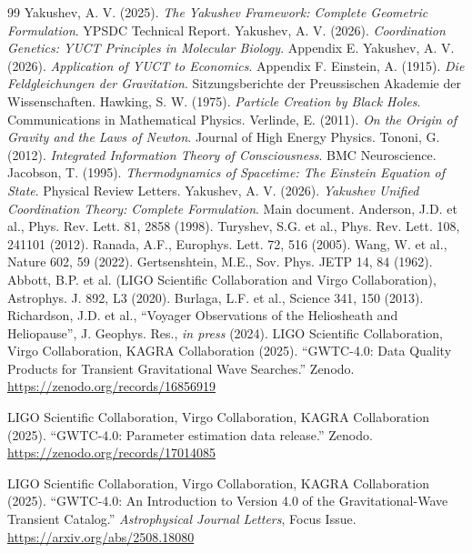 \documentclass[12pt,a4paper]{article}
\theoremstyle{remark}
\begin{document}
	\begin{thebibliography}{99}
		 Yakushev, A. V. (2025). \emph{The Yakushev Framework: Complete Geometric Formulation}. YPSDC Technical Report.
		 Yakushev, A. V. (2026). \emph{Coordination Genetics: YUCT Principles in Molecular Biology}. Appendix E.
		 Yakushev, A. V. (2026). \emph{Application of YUCT to Economics}. Appendix F.
		 Einstein, A. (1915). \emph{Die Feldgleichungen der Gravitation}. Sitzungsberichte der Preussischen Akademie der Wissenschaften.
		 Hawking, S. W. (1975). \emph{Particle Creation by Black Holes}. Communications in Mathematical Physics.
		 Verlinde, E. (2011). \emph{On the Origin of Gravity and the Laws of Newton}. Journal of High Energy Physics.
		 Tononi, G. (2012). \emph{Integrated Information Theory of Consciousness}. BMC Neuroscience.
		 Jacobson, T. (1995). \emph{Thermodynamics of Spacetime: The Einstein Equation of State}. Physical Review Letters.
		 Yakushev, A. V. (2026). \emph{Yakushev Unified Coordination Theory: Complete Formulation}. Main document.
		Anderson, J.D. et al., Phys. Rev. Lett. 81, 2858 (1998).
		Turyshev, S.G. et al., Phys. Rev. Lett. 108, 241101 (2012).
		Ranada, A.F., Europhys. Lett. 72, 516 (2005).
		Wang, W. et al., Nature 602, 59 (2022).
		Gertsenshtein, M.E., Sov. Phys. JETP 14, 84 (1962).
		Abbott, B.P. et al. (LIGO Scientific Collaboration and Virgo Collaboration), Astrophys. J. 892, L3 (2020).
		Burlaga, L.F. et al., Science 341, 150 (2013).
		Richardson, J.D. et al., ``Voyager Observations of the Heliosheath and Heliopause'', J. Geophys. Res., \textit{in press} (2024).
		LIGO Scientific Collaboration, Virgo Collaboration, KAGRA Collaboration (2025). ``GWTC-4.0: Data Quality Products for Transient Gravitational Wave Searches.'' Zenodo. \url{https://zenodo.org/records/16856919}
		
		LIGO Scientific Collaboration, Virgo Collaboration, KAGRA Collaboration (2025). ``GWTC-4.0: Parameter estimation data release.'' Zenodo. \url{https://zenodo.org/records/17014085}
		
		LIGO Scientific Collaboration, Virgo Collaboration, KAGRA Collaboration (2025). ``GWTC-4.0: An Introduction to Version 4.0 of the Gravitational-Wave Transient Catalog.'' \textit{Astrophysical Journal Letters}, Focus Issue. \url{https://arxiv.org/abs/2508.18080}
		

\end{thebibliography}
\end{document}

